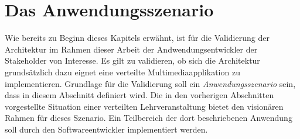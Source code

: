 % 
% 



\section{Das Anwendungsszenario} %
\label{sub:das_anwendungsszenario}

  Wie bereits zu Beginn dieses Kapitels erwähnt, ist für die Validierung der Architektur im Rahmen dieser Arbeit der Andwendungsentwickler der Stakeholder von Interesse. Es gilt zu validieren, ob sich die Architektur grundsätzlich dazu eignet eine verteilte Multimediaapplikation zu implementieren. Grundlage für die Validierung soll ein \emph{Anwendungsszenario} sein, dass in diesem Abschnitt definiert wird. Die in den vorherigen Abschnitten vorgestellte Situation einer verteilten Lehrveranstaltung bietet den visionären Rahmen für dieses Szenario. Ein Teilbereich der dort beschriebenen Anwendung soll durch den Softwareentwickler implementiert werden.


